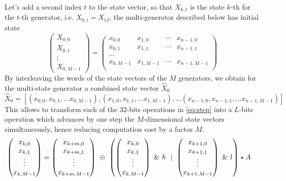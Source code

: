 \documentclass[preprint,1p,times]{elsarticle}
\begin{document}
	Let's add a second index $t$ to the state vector, so that $X_{k,t}$ is the state $k$-th for the $t$-th generator, i.e. $X_{0,t}=X_{tJ}$, the multi-generator described below has initial state
	$$
	\begin{pmatrix}
		X_{0,0} \\ X_{0,1} \\ \vdots \\ X_{0,M-1}
	\end{pmatrix}
	= 
	\begin{pmatrix}
		x_{0,0} & x_{1,0} & \cdots & x_{n-1,0} \\
		x_{0,1} & x_{1,1} & \cdots & x_{n-1,1} \\
		\cdots \\
		x_{0,M-1} & x_{1,M-1} & \cdots & x_{n-1,M-1} \\
	\end{pmatrix}
	$$
	By interleaving the words of the state vectors of the $M$ generators, we obtain for the multi-state generator a combined state vector $\hat{X}_0$
	$$
	\hat{X}_0 = [(x_{0,0}, x_{0,1}, \dots x_{0,M-1}), (x_{1,0}, x_{1,1}, \dots x_{1,M-1}), \dots (x_{n-1,0}, x_{n-1,1}, \dots x_{n-1,M-1})]
	$$
	This allows to transform each of the 32-bits operations in \eqref{eq:step} into a $L$-bits operation which advances by one step the $M$-dimensional state vectors simultaneously, hence reducing computation cost by a factor $M$.
	\begin{align}
		\label{eq:msmt19937}
		\begin{pmatrix}x_{k,0} \\ x_{k,1} \\ \vdots \\ x_{k,M-1} \end{pmatrix}
		&= \begin{pmatrix}x_{k+m, 0} \\ x_{k+m,1} \\ \vdots \\ x_{k+m,M-1} \end{pmatrix} ~\mathbin{\oplus}~ \left(\begin{pmatrix}x_{k,0} \\ x_{k,1} \\ \vdots \\ x_{k,M-1} \end{pmatrix}~\&~h ~\mid~ \begin{pmatrix}x_{k+1,0} \\ x_{k+1,1} \\ \vdots \\ x_{k+1,M-1}  \end{pmatrix}~\&~l\right) \star A
	\end{align}
	
\end{document}
